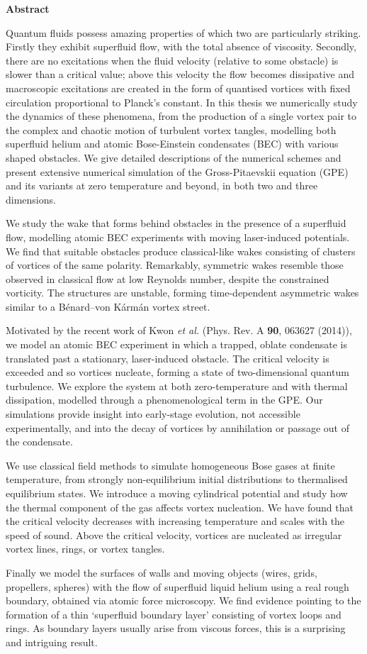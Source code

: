 \begin{center}
{\bf Abstract}
\end{center}
\noindent
Quantum fluids possess amazing properties of which two are particularly striking. Firstly they exhibit superfluid flow, with the total absence of viscosity. Secondly, there are no excitations when the fluid velocity (relative to some obstacle) is slower than a critical value; above this velocity the flow becomes dissipative and macroscopic excitations are created in the form of quantised vortices with fixed circulation proportional to Planck's constant. In this thesis we numerically study the dynamics of these phenomena, from the production of a single vortex pair to the complex and chaotic motion of turbulent vortex tangles, modelling both superfluid helium and atomic Bose-Einstein condensates (BEC) with various shaped obstacles. We give detailed descriptions of the numerical schemes and present extensive numerical simulation of the Gross-Pitaevskii equation (GPE) and its variants at zero temperature and beyond, in both two and three dimensions.

We study the wake that forms behind obstacles in the presence of a superfluid flow, modelling atomic BEC experiments with moving laser-induced potentials. We find that suitable obstacles produce classical-like wakes consisting of clusters of vortices of the same polarity. Remarkably, symmetric wakes resemble those observed in classical flow at low Reynolds number, despite the constrained vorticity.  The structures are unstable, forming time-dependent asymmetric wakes similar to a B\'enard--von K\'arm\'an vortex street.

Motivated by the recent work of Kwon {\it et al.} (Phys. Rev. A {\bf 90}, 063627
(2014)), we model an atomic BEC experiment in which a trapped, oblate condensate is translated past a stationary, laser-induced obstacle. The critical velocity is exceeded and so vortices nucleate, forming a state of two-dimensional quantum turbulence. We explore the system at both zero-temperature and with thermal dissipation, modelled through a phenomenological term in the GPE. Our simulations provide insight into early-stage evolution, not accessible experimentally, and into the decay of vortices by annihilation or passage out of the condensate.

We use classical field methods to simulate homogeneous Bose gases at finite temperature, from strongly non-equilibrium initial distributions to thermalised equilibrium states. We introduce a moving cylindrical potential and study how the thermal component of the gas affects vortex nucleation. We have found that the critical velocity decreases with increasing temperature and scales with the speed of sound. Above the critical velocity, vortices are nucleated as irregular vortex lines, rings, or vortex tangles.

Finally we model the surfaces of walls and moving objects (wires, grids, propellers, spheres) with the flow of superfluid liquid helium using a real rough boundary, obtained via atomic force microscopy. We find evidence pointing to the formation of a thin `superfluid boundary layer' consisting of 
vortex loops and rings. As boundary layers usually arise from viscous forces, this is a surprising and intriguing result.
\thispagestyle{empty}
\cleardoublepage
